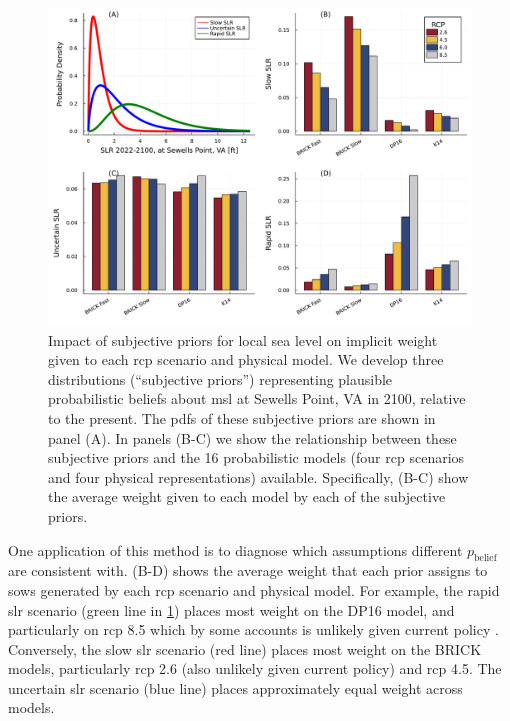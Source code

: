 \documentclass[11pt]{article}
\begin{document}
\begin{figure}
    \centering
    \includegraphics[width=\textwidth]{lsl-priors-weights}
    \caption{
        Impact of subjective priors for local sea level on implicit weight given to each \gls{rcp} scenario and physical model.
        We develop three distributions (``subjective priors'') representing plausible probabilistic beliefs about \gls{msl} at Sewells Point, VA in 2100, relative to the present.
        The \glspl{pdf} of these subjective priors are shown in panel (A).
        In panels (B-C) we show the relationship between these subjective priors and the 16 probabilistic models (four \gls{rcp} scenarios and four physical representations) available.
        Specifically, (B-C) show the average weight given to each model by each of the subjective priors.
    }\label{fig:lsl-priors-weights}
\end{figure}

One application of this method is to diagnose which assumptions different $p_\mathrm{belief}$ are consistent with.
(B-D) shows the average weight that each prior assigns to \glspl{sow} generated by each \gls{rcp} scenario and physical model.
For example, the rapid \gls{slr} scenario (green line in \cref{fig:lsl-priors-weights}) places most weight on the DP16 model, and particularly on \gls{rcp} 8.5 which by some accounts is unlikely given current policy \citep{hausfather_scenarios:2020,srikrishnan_probabilistic:2022}.
Conversely, the slow \gls{slr} scenario (red line) places most weight on the BRICK models, particularly \gls{rcp} 2.6 (also unlikely given current policy) and \gls{rcp} 4.5.
The uncertain \gls{slr} scenario (blue line) places approximately equal weight across models.
\end{document}
